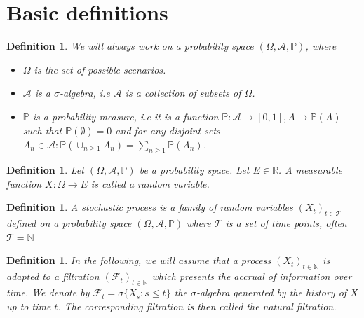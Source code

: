 \documentclass[11pt,a4,twosided,singlespacing,titlepagenumber=on]{scrreprt}
\newcommand\Tau{\mathcal{T}}
\numberwithin{equation}{chapter} %
\newtheorem{definition}[theorem]{Definition}%
\theoremstyle{remark}
\begin{document}

\chapter*{Basic definitions}
\noindent
\begin{definition}
We will always work on a probability space $(\Omega, \mathcal{A}, \mathbb{P})$, where
\begin{itemize}
\item $\Omega$ is the set of possible scenarios.
\item $\mathcal{A}$ is a $\sigma$-algebra, i.e $\mathcal{A}$ is a collection of subsets of $\Omega$.
\item $\mathbb{P}$ is a probability measure, i.e it is a function $\mathbb{P} : \mathcal{A} \rightarrow [0,1], A \rightarrow \mathbb{P}(A)$ such that $\mathbb{P}(\emptyset) = 0$ and for any disjoint sets $A_n \in \mathcal{A} : \mathbb{P}(\cup_{n \geq 1} A_n) = \sum_{n \geq 1} \mathbb{P}(A_n)$.
\end{itemize}
\end{definition}

\begin{definition}
Let $(\Omega, \mathcal{A}, \mathbb{P})$ be a probability space. Let $E \in \mathbb{R}$. A measurable function $X : \Omega \rightarrow E$ is called a random variable.
\end{definition}

\begin{definition}
A stochastic process is a family of random variables $(X_t)_{t \in \Tau}$ defined on a probability space $(\Omega, \mathcal{A}, \mathbb{P})$ where $\Tau$ is a set of time points, often $\Tau = \mathbb{N}$
\end{definition}

\begin{definition}
In the following, we will assume that a process $(X_t)_{t \in \mathbb{N}}$ is adapted to a filtration $(\mathcal{F}_t)_{t \in \mathbb{N}}$ which presents the accrual of information over time. We denote by $\mathcal{F}_t = \sigma \{X_s : s \leq t \}$ the $\sigma$-algebra generated by the history of $X$ up to time $t$. The corresponding filtration is then called the natural filtration.
\end{definition}
\end{document}
